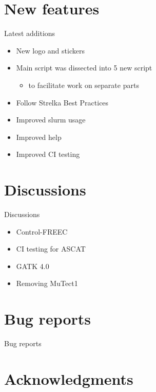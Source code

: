\documentclass{beamer}
\begin{document}
\section{New features}

\begin{frame}{Latest additions}
	\begin{itemize}
		\item New logo and stickers
		\item Main script was dissected into 5 new script
		\begin{itemize}
			\item to facilitate work on separate parts
		\end{itemize}
		\item Follow Strelka Best Practices
		\item Improved slurm usage
		\item Improved help
		\item Improved CI testing
	\end{itemize}
\end{frame}

\section{Discussions}

\begin{frame}{Discussions}
	\begin{itemize}
		\item Control-FREEC
		\item CI testing for ASCAT
		\item GATK 4.0
		\item Removing MuTect1
	\end{itemize}
\end{frame}

\section{Bug reports}

\begin{frame}{Bug reports}
\end{frame}

\section{Acknowledgments}
\end{document}
